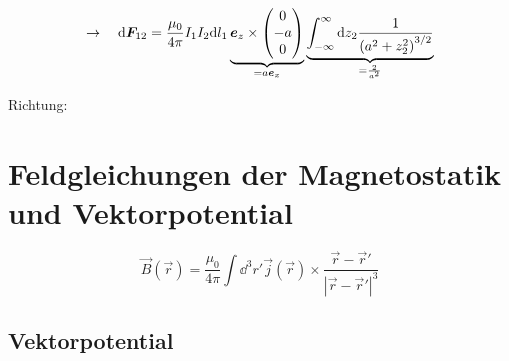 \noindent
\begin{minipage}{.75\linewidth}
	\begin{align*}
	\rightarrow \quad \textrm{d} \bm{F}_{12} = \frac{\mu_0}{4 \pi} I_1 I_2 \textrm{d} l_1 \underbrace{\bm{e}_z \times \begin{pmatrix}
		0 \\ -a \\ 0
		\end{pmatrix}}_{= a \bm{e}_x} \underbrace{\int_{-\infty}^{\infty} \textrm{d} z_2 \frac{1}{\left(a^2 + z_2^2\right)^{3/2}}}_{= \frac{2}{a^2}}
	\end{align*}
\end{minipage}%
\begin{minipage}{.25\linewidth}
	Richtung:\\
	\flushright
\end{minipage}%
\begin{center}
	\begin{minipage}{.5\linewidth}
	\end{minipage}
\end{center}

\section{Feldgleichungen der Magnetostatik und Vektorpotential}

\begin{equation*}
\vec{B}(\vec{r}) = \frac{\mu_0}{4 \pi} \int \dd^3 r' \vec{j}(\vec{r}) \times \frac{\vec{r} - \vec{r}'}{|\vec{r} - \vec{r}'|^3}
\end{equation*}

\subsection{Vektorpotential}

